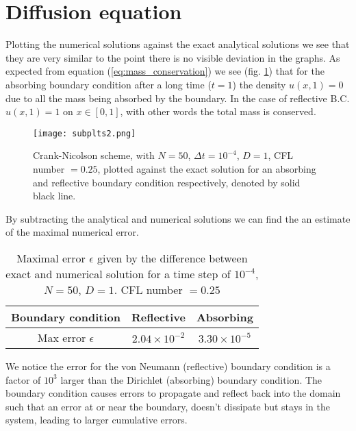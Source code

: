 \documentclass[5p,sort&compress]{elsarticle}
\numberwithin{equation}{subsection}
\begin{document}
\section{Diffusion equation}
Plotting the numerical solutions against the exact analytical solutions we see that they are very similar to the point there is no visible deviation in the graphs.
As expected from equation (\ref{eq:mass_conservation}) we see (fig. \ref{fig:subplots2}) that for the absorbing boundary condition  after a long time ($t=1$) the density $u(x,1) = 0$ due to all the mass being absorbed by the boundary. In the case of reflective B.C. $u(x,1) = 1$ on $x\in[0,1]$, with other words the total mass is conserved.
\begin{figure}[H]
\centering
\texttt{[image: subplts2.png]} %
\caption{Crank-Nicolson scheme, with $N = 50$, $\Delta t = 10^{-4}$, $D = 1$, CFL number $= 0.25$, plotted against the exact solution for an absorbing and reflective boundary condition respectively, denoted by solid black line.}
\label{fig:subplots2}
\end{figure}

By subtracting the analytical and numerical solutions we can find the an estimate of the maximal numerical error.
\begin{table}[H]
\centering
\begin{tabular}{c|cc}
\hline
Boundary condition & Reflective & Absorbing  \\ \hline
Max error $\epsilon$ & $2.04\times10^{-2}$ & $3.30\times10^{-5}$ \\ 
\end{tabular}
\caption{Maximal error $\epsilon$ given by the difference between exact and numerical solution for a time step of $10^{-4}$, $N = 50$, $D = 1$. CFL number $=0.25$}
\label{error_diffusion}
\end{table}
We notice the error for the von Neumann (reflective) boundary condition is a factor of $10^3$ larger than the Dirichlet (absorbing) boundary condition. The boundary condition causes errors to propagate and reflect back into the domain such that an error at or near the boundary, doesn't dissipate but stays in the system, leading to larger cumulative errors.
\end{document}
